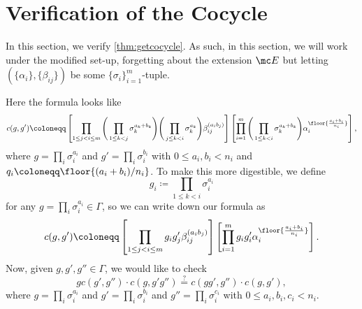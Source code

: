 \documentclass{article}
\numberwithin{equation}{section}
\begin{document}
\newpage
\appendix
\section{Verification of the Cocycle} \label{sec:verifycocycle}
In this section, we verify \autoref{thm:getcocycle}. As such, in this section, we will work under the modified set-up, forgetting about the extension $\mc E$ but letting $(\{\alpha_i\},\{\beta_{ij}\})$ be some $\{\sigma_i\}_{i=1}^m$-tuple.

Here the formula looks like
\[c(g,g')\coloneqq\left[\prod_{1\le j<i\le m}\Bigg(\prod_{1\le k<j}\sigma_k^{a_k+b_k}\Bigg)\Bigg(\prod_{j\le k<i}\sigma_k^{a_k}\Bigg)\beta_{ij}^{(a_ib_j)}\right]\left[\prod_{i=1}^m\Bigg(\prod_{1\le k<i}\sigma_k^{a_k+b_k}\Bigg)\alpha_i^{\floor{\frac{a_i+b_i}{n_i}}}\right],\]
where $g=\prod_i\sigma_i^{a_i}$ and $g'=\prod_i\sigma_i^{b_i}$ with $0\le a_i,b_i<n_i$ and $q_i\coloneqq\floor{(a_i+b_i)/n_i}$. To make this more digestible, we define
\[g_i\coloneqq\prod_{1\le k<i}\sigma_i^{a_i}\]
for any $g=\prod_i\sigma_i^{a_i}\in\Gamma$, so we can write down our formula as
\[c(g,g')\coloneqq\left[\prod_{1\le j<i\le m}g_ig'_j\beta_{ij}^{(a_ib_j)}\right]\left[\prod_{i=1}^mg_ig'_i\alpha_i^{\floor{\frac{a_i+b_i}{n_i}}}\right].\]
Now, given $g,g',g''\in\Gamma$, we would like to check
\[gc(g',g'')\cdot c(g,g'g'')\stackrel?=c(gg',g'')\cdot c(g,g'),\]
where $g=\prod_i\sigma_i^{a_i}$ and $g'=\prod_i\sigma_i^{b_i}$ and $g''=\prod_i\sigma_i^{c_i}$ with $0\le a_i,b_i,c_i<n_i$.
\end{document}
